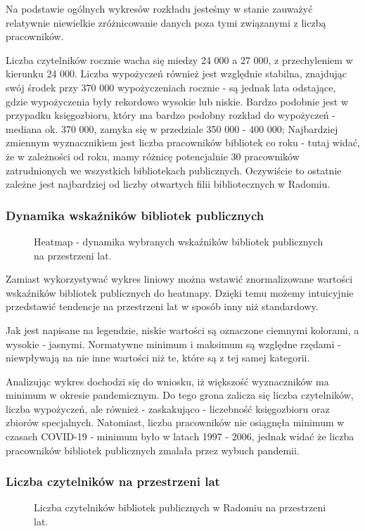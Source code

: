 \documentclass[12pt]{article}
\begin{document}
Na podstawie ogólnych wykresów rozkładu jesteśmy w stanie zauważyć relatywnie niewielkie zróżnicowanie danych poza tymi związanymi 
z liczbą pracowników. 

Liczba czytelników rocznie wacha się miedzy 24 000 a 27 000, z przechyleniem w kierunku 24 000. 
Liczba wypożyczeń również jest względnie stabilna, znajdując swój środek przy 370 000 wypożyczeniach rocznie - są jednak lata odstające, 
gdzie wypożyczenia były rekordowo wysokie lub niskie. Bardzo podobnie jest w przypadku księgozbioru, który ma bardzo podobny rozkład
do wypożyczeń - mediana ok. 370 000, zamyka się w przedziale 350 000 - 400 000; Najbardziej zmiennym wyznacznikiem jest liczba 
pracowników bibliotek co roku - tutaj widać, że w zależności od roku, mamy różnicę potencjalnie 30 pracowników zatrudnionych we wszystkich
bibliotekach publicznych. Oczywiście to ostatnie zależne jest najbardziej od liczby otwartych filii bibliotecznych w Radomiu. 


\subsubsection{Dynamika wskaźników bibliotek publicznych}
\begin{figure}[H]
    
    \caption{Heatmap - dynamika wybranych wskaźników bibliotek publicznych na przestrzeni lat.}
\end{figure}

Zamiast wykorzystywać wykres liniowy można wstawić znormalizowane wartości wskaźników bibliotek publicznych do heatmapy.
Dzięki temu możemy intuicyjnie przedstawić tendencje na przestrzeni lat w sposób inny niż standardowy. 

Jak jest napisane na legendzie, niskie wartości są oznaczone ciemnymi kolorami, a wysokie - jasnymi. Normatywne minimum i maksimum 
są względne rzędami - niewpływają na nie inne wartości niż te, które są z tej samej kategorii. 

Analizując wykres dochodzi się do wniosku, iż większość wyznaczników ma minimum w okresie pandemicznym. Do tego grona zalicza się 
liczba czytelników, liczba wypożyczeń, ale również - zaskakująco - liczebność księgozbioru oraz zbiorów specjalnych. Natomiast, 
liczba pracowników nie osiągnęła minimum w czasach COVID-19 - minimum było w latach 1997 - 2006, jednak widać że liczba pracowników 
bibliotek publicznych zmalała przez wybuch pandemii.

\subsubsection{Liczba czytelników na przestrzeni lat}
\begin{figure}[H]
    
    \caption{Liczba czytelników bibliotek publicznych w Radomiu na przestrzeni lat.}
\end{figure}
\end{document}
